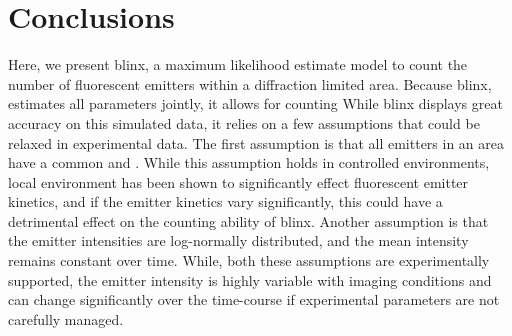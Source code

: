 \section{Conclusions}
Here, we present blinx, a maximum likelihood estimate model to count the number of fluorescent emitters within a diffraction limited area.
%
Because blinx, estimates all parameters jointly, it allows for counting 
While blinx displays great accuracy on this simulated data, it relies on a few assumptions that could be relaxed in experimental data.
%
The first assumption is that all emitters in an area have a common \pon and \poff. 
%
While this assumption holds in controlled environments, local environment has been shown to significantly effect fluorescent emitter kinetics, and if the emitter kinetics vary significantly, this could have a detrimental effect on the counting ability of blinx. 
%
Another assumption is that the emitter intensities are log-normally distributed, and the mean intensity remains constant over time. While, both these assumptions are experimentally supported, the emitter intensity is highly variable with imaging conditions and can change significantly over the time-course if experimental parameters are not carefully managed. 
%


